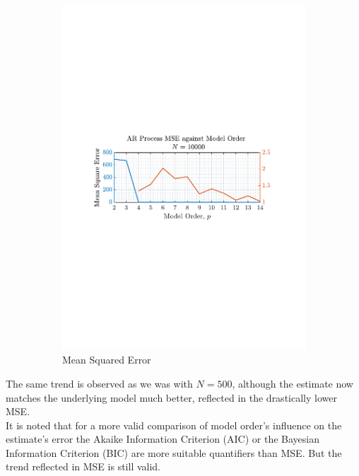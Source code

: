 \documentclass[12pt]{article}
\begin{document}
\begin{figure}[H]
\begin{subfigure}{0.49\textwidth}
			\includegraphics[trim={2.2cm 11.2cm 3cm  11.2cm}, clip, width=\textwidth]{../MATLAB/figures/q1_4c_fig16.pdf} 
			\captionsetup{justification=centering}
			\caption{Mean Squared Error}
		\end{subfigure}
		\captionsetup{justification=centering}
		\caption{}
		\label{fig: 1-4c}
	\end{figure}

	The same trend is observed as we was with $N=500$, although the estimate now matches the underlying model much better, reflected in the drastically lower MSE. \\
	
	It is noted that for a more valid comparison of model order's influence on the estimate's error the Akaike
	Information Criterion (AIC) or the Bayesian Information Criterion (BIC) are more suitable quantifiers than MSE. But the trend reflected in MSE is still valid.
	
\end{document}
